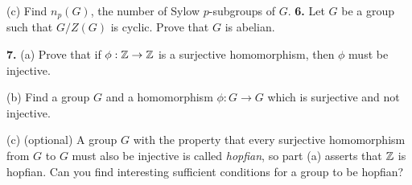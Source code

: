 \documentclass[12pt]{article}
\begin{document}
(c) Find $n_p(G)$, the number of Sylow $p$-subgroups of $G$.
\skv
{\bf 6.} Let $G$ be a group such that $G/Z(G)$ is cyclic.
Prove that $G$ is abelian.
\skv

{\bf 7.} (a) Prove that if $\phi:{\mathbb Z}\to{\mathbb Z}$ is a surjective homomorphism,
then $\phi$ must be injective. 

(b) Find a group $G$ and a homomorphism $\phi:G\to G$ which is surjective
and not injective.

(c) (optional) A group $G$ with the property that every surjective homomorphism from
$G$ to $G$ must also be injective is called {\it hopfian}, so part (a) asserts
that ${\mathbb Z}$ is hopfian. Can you find interesting sufficient conditions for
a group to be hopfian?
\skv
\end{document}
